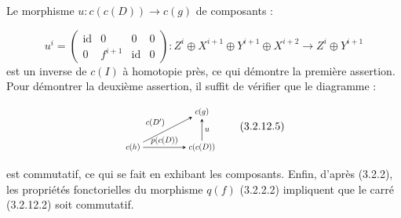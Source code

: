 Le morphisme $u\colon c(c(D))\longrightarrow c(g)$ de composants :

\begin{equation}
  u^i=
  \begin{pmatrix}
    \operatorname{id}&0&0&0\\
    0&f^{i+1}&\operatorname{id}&0
  \end{pmatrix}
  \colon Z^i\oplus X^{i+1}\oplus Y^{i+1}\oplus X^{i+2}
  \longrightarrow Z^i\oplus Y^{i+1}
  \tag{3.2.12.4}
\end{equation}
est un inverse de $c(I)$ à homotopie près, ce qui démontre la première
assertion. Pour démontrer la deuxième assertion, il suffit de vérifier que
le diagramme :

\begin{equation}
  \begin{tikzpicture}[>=stealth,baseline=(current bounding box.center),scale=0.74,
    every node/.style={transform shape}]
    \node (Ch) at (0,0) {$c(h)$};
    \node (Cg) at (3.0,1.55) {$c(g)$};
    \node (CcD) at (3.0,0) {$c(c(D))$};
    \draw[->] (Ch) -- node[above left] {$c(D')$} (Cg);
    \draw[->] (CcD) -- node[right] {$u$} (Cg);
    \draw[->] (Ch) -- node[above] {$p(c(D))$} (CcD);
  \end{tikzpicture}
  \tag{3.2.12.5}
\end{equation}

est commutatif, ce qui se fait en exhibant les composants. Enfin, d'après
(3.2.2), les propriétés fonctorielles du morphisme $q(f)$ (3.2.2.2)
impliquent que le carré (3.2.12.2) soit commutatif.
\endgroup

